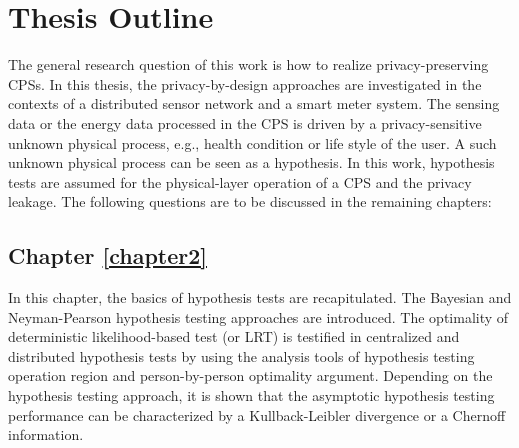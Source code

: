 \section{Thesis Outline}
\label{section1.3}
The general research question of this work is {how to realize privacy-preserving CPSs}. In this thesis, the privacy-by-design approaches are investigated in the contexts of a distributed sensor network and a smart meter system. The sensing data or the energy data processed in the CPS is driven by a privacy-sensitive unknown physical process, e.g., health condition or life style of the user. A such unknown physical process can be seen as a hypothesis. In this work, hypothesis tests are assumed for the physical-layer operation of a CPS and the privacy leakage. The following questions are to be discussed in the remaining chapters:

\subsection{Chapter \ref{chapter2}}
In this chapter, the basics of hypothesis tests are recapitulated. The Bayesian and Neyman-Pearson hypothesis testing approaches are introduced. The optimality of deterministic likelihood-based test (or LRT) is testified in centralized and distributed hypothesis tests by using the analysis tools of hypothesis testing operation region and person-by-person optimality argument. Depending on the hypothesis testing approach, it is shown that the asymptotic hypothesis testing performance can be characterized by a Kullback-Leibler divergence or a Chernoff information.

